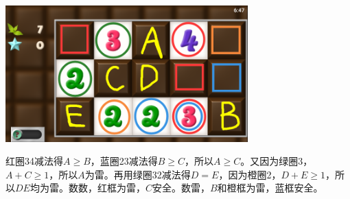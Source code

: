 \subsection{} %
\begin{center}
    \includegraphics[width=0.7\textwidth]{puzzle/109-1.png}
\end{center}
红圈34减法得$A\ge B$，蓝圈23减法得$B\ge C$，所以$A\ge C$。又因为绿圈3，$A+C\ge 1$，所以$A$为雷。再用绿圈32减法得$D=E$，因为橙圈2，$D+E\ge 1$，所以$DE$均为雷。数数，红框为雷，$C$安全。数雷，$B$和橙框为雷，蓝框安全。

